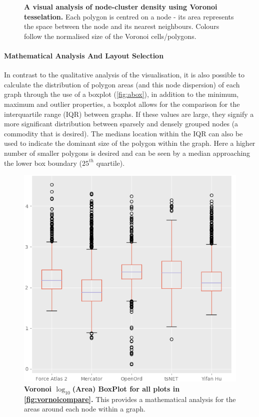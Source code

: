 \begin{figure}[H]
        \caption{\textbf{A visual analysis of node-cluster density using Voronoi tesselation.} Each polygon is centred on a node - its area represents the space between the node and its nearest neighbours. Colours follow the normalised size of the Voronoi cells/polygons.}
        \label{fig:vornoicompare}
\end{figure}



\paragraph*{Mathematical Analysis And Layout Selection}
In contrast to the qualitative analysis of the visualisation, it is also possible to calculate the distribution of polygon areas (and this node dispersion) of each graph through the use of a boxplot (\autoref{fig:abox}), in addition to the minimum, maximum and outlier properties, a boxplot allows for the comparison for the interquartile range (IQR) between graphs. If these values are large, they signify a more significant distribution between sparsely and densely grouped nodes (a commodity that is desired). The medians location within the IQR can also be used to indicate the dominant size of the polygon within the graph. Here a higher number of smaller polygons is desired and can be seen by a median approaching the lower box boundary ($25^{th}$ quartile).

\begin{figure}[H]
\centering \includegraphics[width=.6\textwidth]{figures_c1/area/log10layoutbox.png}
\caption{\textbf{Voronoi $\log_{10}$(Area) BoxPlot for all plots in \autoref{fig:vornoicompare}.} This provides a mathematical analysis for the areas around each node within a graph. }
\label{fig:abox}
\end{figure}


